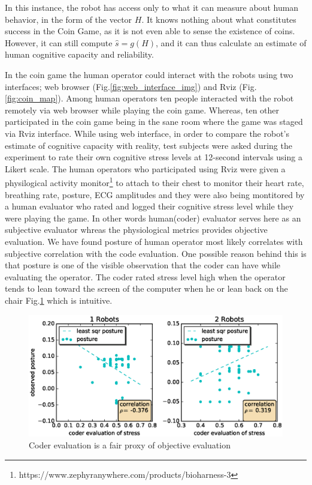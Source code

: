 \documentclass{sig-alternate}
\begin{document}
In this instance, the robot has access only to what it can measure
about human behavior, in the form of the vector $H$.  It knows nothing
about what constitutes success in the Coin Game, as it is not even
able to sense the existence of coins.  However, it can still compute
$\hat{s} = g(H)$, and it can thus calculate an estimate of human
cognitive capacity and reliability.

In the coin game the human operator could interact with the robots using two interfaces; web browser (Fig.\ref{fig:web_interface_img}) and Rviz (Fig.\ref{fig:coin_map}). Among human operators ten people interacted with the robot remotely via web browser while playing the coin game. Whereas, ten other participated in the coin game being in the sane room where the game was staged via Rviz interface.
While using web interface, in order to compare the robot's estimate of cognitive capacity with
reality, test subjects were asked during the experiment to rate their
own cognitive stress levels at 12-second intervals using a Likert
scale. The human operators who participated using Rviz were given a physilogical activity monitor\footnote{https://www.zephyranywhere.com/products/bioharness-3} to attach to their chest to monitor their heart rate, breathing rate, posture, ECG amplitudes and they were also being montitored by a human evaluator who rated and logged their cognitive stress level while they were playing the game. In other words human(coder) evaluator serves here as an subjective evaluator whreas the physiological metrics provides objective evaluation. We have found posture of human operator most likely correlates with subjective correlation with the code evaluation. One possible reason behind this is that posture is one of the visible observation that the coder can have while evaluating the operator. The coder rated stress level high when the operator tends to lean toward the screen of the computer when he or lean back on the chair Fig.\ref{fig:coder_vs_posture} which is intuitive.

\begin{figure}  
\centering
\includegraphics[width=.5\textwidth]{coder_vs_posture.eps}
\caption{Coder evaluation is a fair proxy of objective evaluation}
\label{fig:coder_vs_posture}
\end{figure}
\end{document}
